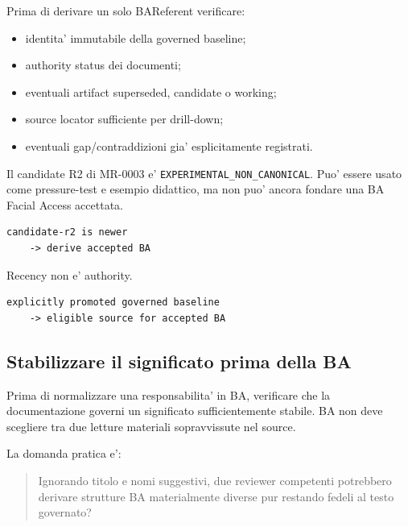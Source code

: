 \documentclass[11pt,a4paper]{article}
\newcommand{\code}[1]{\nolinkurl{#1}}
\begin{document}
Prima di derivare un solo BAReferent verificare:

\begin{itemize}
\item identita' immutabile della governed baseline;
\item authority status dei documenti;
\item eventuali artifact superseded, candidate o working;
\item source locator sufficiente per drill-down;
\item eventuali gap/contraddizioni gia' esplicitamente registrati.
\end{itemize}

\begin{examplebox}
Il candidate R2 di MR-0003 e' \code{EXPERIMENTAL_NON_CANONICAL}. Puo' essere usato come pressure-test e esempio didattico, ma non puo' ancora fondare una BA Facial Access accettata.
\end{examplebox}

\begin{badbox}
\begin{lstlisting}
candidate-r2 is newer
    -> derive accepted BA
\end{lstlisting}
Recency non e' authority.
\end{badbox}

\begin{goodbox}
\begin{lstlisting}
explicitly promoted governed baseline
    -> eligible source for accepted BA
\end{lstlisting}
\end{goodbox}


\subsection{Stabilizzare il significato prima della BA}

\begin{statusworking}
Prima di normalizzare una responsabilita' in BA, verificare che la documentazione governi un significato sufficientemente stabile. BA non deve scegliere tra due letture materiali sopravvissute nel source.
\end{statusworking}

La domanda pratica e':

\begin{quote}
Ignorando titolo e nomi suggestivi, due reviewer competenti potrebbero derivare strutture BA materialmente diverse pur restando fedeli al testo governato?
\end{quote}
\end{document}
